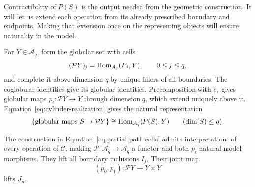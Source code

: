 Contractibility of \(P(S)\) is the output needed from the geometric
construction.  It will let us extend each operation from its already
prescribed boundary and endpoints.  Making that extension once on the
representing objects will ensure naturality in the model.

For \(Y\in\mathcal A_q\), form the globular set with cells
\begin{equation}\label{eq:partial-path-cells}
           (\mathcal P Y)_j=\operatorname{Hom}_{\mathcal A_q}(P_j,Y),
                     \qquad 0\le j\le q,
\end{equation}
and complete it above dimension \(q\) by unique fillers of all
boundaries.  The coglobular identities give its globular identities.
Precomposition with \(e_\epsilon\) gives globular maps
\(p_\epsilon:\mathcal P Y\to Y\) through dimension \(q\),
which extend uniquely above it.  Equation~\eqref{eq:cylinder-realization}
gives the natural representation
\begin{equation}\label{eq:partial-path-tuples}
 \{\text{globular maps }S\to\mathcal P Y\}
       \cong\operatorname{Hom}_{\mathcal A_q}(P(S),Y)
             \qquad(\dim(S)\le q).
\end{equation}

\begin{proposition}\label{prop:partial-path}
The construction in Equation~\eqref{eq:partial-path-cells} admits
interpretations of every operation of \(\mathcal C\), making
\(\mathcal P:\mathcal A_q\to\mathcal A_q\) a functor and
both \(p_\epsilon\) natural model morphisms.  They lift all
boundary inclusions \(I_j\).  Their joint map
\[
              (p_0,p_1):\mathcal P Y\longrightarrow Y\times Y
\]
lifts \(J_n\).
\end{proposition}


